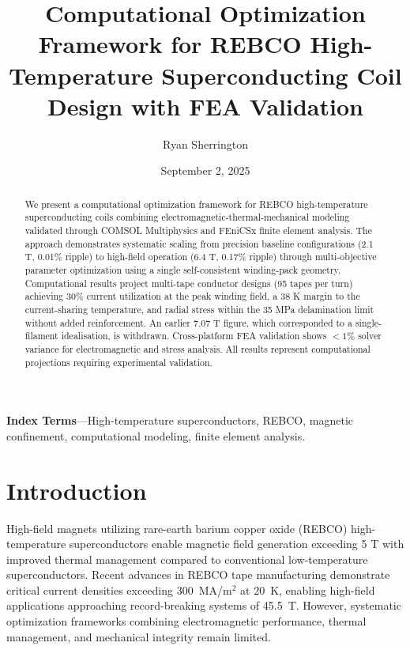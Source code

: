 \documentclass[aps,prb,preprint,amsmath,amssymb]{revtex4-2}
\begin{document}
\title{Computational Optimization Framework for REBCO High-Temperature Superconducting Coil Design with FEA Validation}
\author{Ryan Sherrington}
\date{September 2, 2025}

\sloppy

\begin{abstract}
We present a computational optimization framework for REBCO high-temperature superconducting coils combining electromagnetic-thermal-mechanical modeling validated through COMSOL Multiphysics and FEniCSx finite element analysis. The approach demonstrates systematic scaling from precision baseline configurations (2.1 T, 0.01\% ripple) to high-field operation (6.4 T, 0.17\% ripple) through multi-objective parameter optimization using a single self-consistent winding-pack geometry. Computational results project multi-tape conductor designs (95 tapes per turn) achieving 30\% current utilization at the peak winding field, a 38 K margin to the current-sharing temperature, and radial stress within the 35 MPa delamination limit without added reinforcement. An earlier 7.07 T figure, which corresponded to a single-filament idealisation, is withdrawn. Cross-platform FEA validation shows $<1\%$ solver variance for electromagnetic and stress analysis. All results represent computational projections requiring experimental validation.
\end{abstract}

\maketitle

\textbf{Index Terms}---High-temperature superconductors, REBCO, magnetic confinement, computational modeling, finite element analysis.

\section{Introduction}

High-field magnets utilizing rare-earth barium copper oxide (REBCO) high-temperature superconductors enable magnetic field generation exceeding 5 T with improved thermal management compared to conventional low-temperature superconductors. Recent advances in REBCO tape manufacturing demonstrate critical current densities exceeding 300~MA/m$^2$ at 20~K, enabling high-field applications approaching record-breaking systems of 45.5~T. However, systematic optimization frameworks combining electromagnetic performance, thermal management, and mechanical integrity remain limited.
\end{document}
